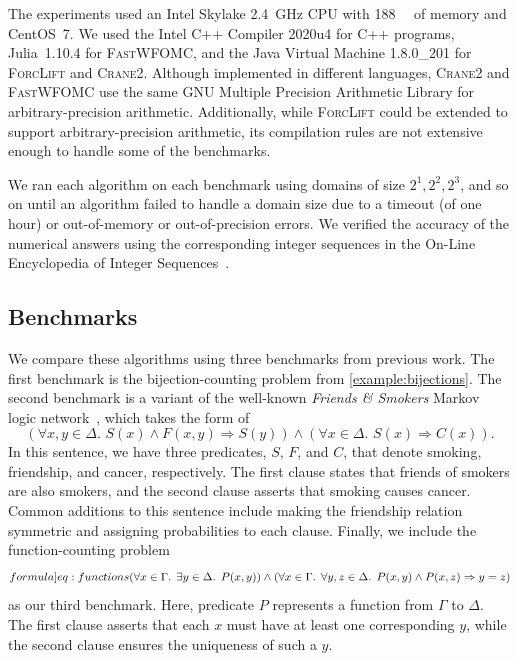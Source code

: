 \documentclass[a4paper,UKenglish,cleveref,autoref]{lipics-v2021}
\newcommand{\Cranetwo}{\textsc{Crane2}}
\newcommand{\friends}{\emph{Friends \& Smokers}}
\begin{document}
The experiments used an Intel Skylake \SI{2.4}{\giga\hertz} CPU with
\SI{188}{\gibi\byte} of memory and CentOS~7. We used the Intel C++ Compiler
2020u4 for C++ programs, Julia~1.10.4 for \textsc{FastWFOMC}, and the Java
Virtual Machine 1.8.0\_201 for \textsc{ForcLift} and \Cranetwo{}. Although
implemented in different languages, \Cranetwo{} and \textsc{FastWFOMC} use the
same GNU Multiple Precision Arithmetic Library for arbitrary-precision
arithmetic. Additionally, while \textsc{ForcLift} could be extended to support
arbitrary-precision arithmetic, its compilation rules are not extensive enough
to handle some of the benchmarks.

We ran each algorithm on each benchmark using domains of size
$2^{1}, 2^{2}, 2^{3}$, and so on until an algorithm failed to handle a domain
size due to a timeout (of one hour) or out-of-memory or out-of-precision errors.
We verified the accuracy of the numerical answers using the corresponding
integer sequences in the On-Line Encyclopedia of Integer Sequences~\cite{oeis}.

\subsection{Benchmarks}

We compare these algorithms using three benchmarks from previous work. The first
benchmark is the bijection-counting problem from \cref{example:bijections}. The
second benchmark is a variant of the well-known \friends{} Markov logic
network~\cite{DBLP:conf/aaai/SinglaD08,DBLP:conf/uai/BroeckCD12}, which takes
the form of
\[
  (\forall x,y \in \Delta\text{.
  } S(x) \land F(x, y) \Rightarrow S(y)) \land (\forall x \in \Delta\text{.
  }S(x) \Rightarrow C(x)).
\]
In this sentence, we have three predicates, $S$, $F$, and $C$, that denote
smoking, friendship, and cancer, respectively. The first clause states that
friends of smokers are also smokers, and the second clause asserts that smoking
causes cancer. Common additions to this sentence include making the friendship
relation symmetric and assigning probabilities to each clause. Finally, we
include the function-counting problem~\cite{DBLP:conf/kr/DilkasB23}
\begin{equation}\label[formula]{eq:functions}
  (\forall x \in \Gamma\text{. }\exists y \in \Delta\text{.
  }P(x, y)) \land (\forall x \in \Gamma\text{. }\forall y, z \in \Delta\text{.
  }P(x, y) \land P(x, z) \Rightarrow y = z)
\end{equation}
as our third benchmark. Here, predicate $P$ represents a function from $\Gamma$
to $\Delta$. The first clause asserts that each $x$ must have at least one
corresponding $y$, while the second clause ensures the uniqueness of such a $y$.
\end{document}

